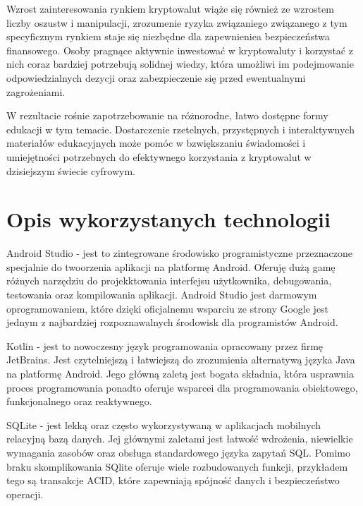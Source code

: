 Wzrost zainteresowania rynkiem kryptowalut wiąże się również ze wzrostem liczby oszustw i manipulacji, zrozumenie ryzyka związaniego związanego z tym specyficznym rynkiem staje się niezbędne dla zapewnieniea bezpieczeństwa finansowego. Osoby pragnące aktywnie inwestować w kryptowaluty i korzystać z nich coraz bardziej potrzebują solidnej wiedzy, która umożliwi im podejmowanie odpowiedzialnych dezycji oraz zabezpieczenie się przed ewentualnymi zagrożeniami. 

W rezultacie rośnie zapotrzebowanie na różnorodne, łatwo dostępne formy edukacji w tym temacie. Dostarczenie rzetelnych, przystępnych i interaktywnych materiałów edukacyjnych może pomóc w bzwiększaniu świadomości i umiejętności potrzebnych do efektywnego korzystania z kryptowalut w dzisiejszym świecie cyfrowym. 

\section{Opis wykorzystanych technologii}

Android Studio \parencite{www:androidstudio} - jest to zintegrowane środowisko programistyczne przeznaczone specjalnie do twoorzenia aplikacji na platformę Android. Oferuję dużą gamę różnych narzędziu do projekktowania interfejsu użytkownika, debugowania, testowania oraz kompilowania aplikacji. Android Studio jest darmowym oprogramowaniem, które dzięki oficjalnemu wsparciu ze strony Google jest jednym z najbardziej rozpoznawalnych środowisk dla programistów Android.

Kotlin \parencite{www:kotlin} - jest to nowoczesny język programowania opracowany przez firmę JetBrains. Jest czytelniejszą i łatwiejszą do zrozumienia alternatywą języka Java na platformę Android. Jego główną zaletą jest bogata składnia, która usprawnia proces programowania ponadto oferuje wsparcei dla programowania obiektowego, funkcjonalnego oraz reaktywnego. 

SQLite \parencite{www:sqlite} - jest lekką oraz często wykorzystywaną w aplikacjach mobilnych relacyjną bazą danych. Jej głównymi zaletami jest łatwość wdrożenia, niewielkie wymagania zasobów oraz obsługa standardowego języka zapytań SQL. Pomimo braku skomplikowania SQlite oferuje wiele rozbudowanych funkcji, przykładem tego są transakcje ACID, które zapewniają spójność danych  i bezpieczeństwo operacji. 